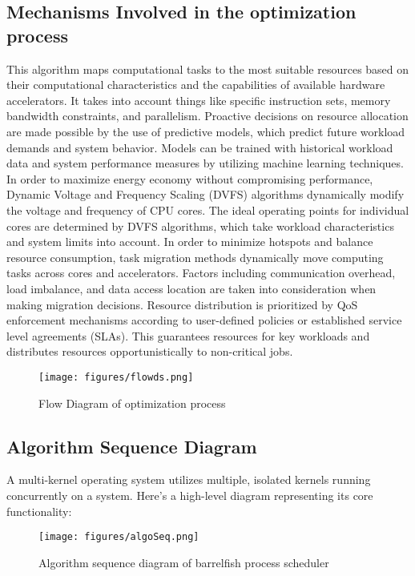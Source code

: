 \documentclass[16pt,a4paper]{article}
\begin{document}
\subsection{Mechanisms Involved in the optimization process}
This algorithm maps computational tasks to the most suitable resources based on their computational characteristics and the capabilities of available hardware accelerators. It takes into account things like specific instruction sets, memory bandwidth constraints, and parallelism. Proactive decisions on resource allocation are made possible by the use of predictive models, which predict future workload demands and system behavior. Models can be trained with historical workload data and system performance measures by utilizing machine learning techniques. In order to maximize energy economy without compromising performance, Dynamic Voltage and Frequency Scaling (DVFS) algorithms dynamically modify the voltage and frequency of CPU cores. The ideal operating points for individual cores are determined by DVFS algorithms, which take workload characteristics and system limits into account. In order to minimize hotspots and balance resource consumption, task migration methods dynamically move computing tasks across cores and accelerators. Factors including communication overhead, load imbalance, and data access location are taken into consideration when making migration decisions. Resource distribution is prioritized by QoS enforcement mechanisms according to user-defined policies or established service level agreements (SLAs). This guarantees resources for key workloads and distributes resources opportunistically to non-critical jobs.

\begin{figure}[H]
  \centering
  \texttt{[image: figures/flowds.png]}  
  \label{fig:3.1.2} 
  \caption{Flow Diagram of optimization process}
\end{figure}

\subsection{Algorithm Sequence Diagram}
A multi-kernel operating system utilizes multiple, isolated kernels running concurrently on a system. Here's a high-level diagram representing its core functionality:

\begin{figure}[H]
  \centering
  \texttt{[image: figures/algoSeq.png]}  
  \label{fig:3.1.3} 
  \caption{Algorithm sequence diagram of barrelfish process scheduler}
\end{figure}
\end{document}
